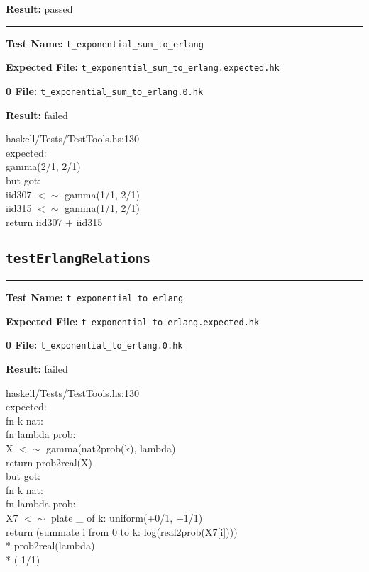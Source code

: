 \documentclass[11pt]{article}
\begin{document}
\bigskip
\textbf{Result:} passed

\bigskip
\hrule

\bigskip
\textbf{Test Name:} {\tt t\_exponential\_sum\_to\_erlang}

\textbf{Expected File:} {\tt t\_exponential\_sum\_to\_erlang.expected.hk}

\bigskip


\bigskip
\textbf{0 File:} {\tt t\_exponential\_sum\_to\_erlang.0.hk}

\bigskip


\bigskip
\textbf{Result:} failed

\bigskip
\noindent


\bigskip
\noindent
haskell/Tests/TestTools.hs:130\\expected:\\gamma(2/1, 2/1)\\but got:\\iid307 $<\sim$ gamma(1/1, 2/1)\\iid315 $<\sim$ gamma(1/1, 2/1)\\return iid307 + iid315\\

\subsection{{\tt testErlangRelations}}

\hrule

\bigskip
\textbf{Test Name:} {\tt t\_exponential\_to\_erlang}

\textbf{Expected File:} {\tt t\_exponential\_to\_erlang.expected.hk}

\bigskip


\bigskip
\textbf{0 File:} {\tt t\_exponential\_to\_erlang.0.hk}

\bigskip


\bigskip
\textbf{Result:} failed

\bigskip
\noindent


\bigskip
\noindent
haskell/Tests/TestTools.hs:130\\expected:\\fn k nat:\\fn lambda prob:\\X $<\sim$ gamma(nat2prob(k), lambda)\\return prob2real(X)\\but got:\\fn k nat:\\fn lambda prob:\\X7 $<\sim$ plate \_ of k: uniform(+0/1, +1/1)\\return (summate i from 0 to k: log(real2prob(X7[i])))\\       * prob2real(lambda)\\       * (-1/1)\\
\end{document}
